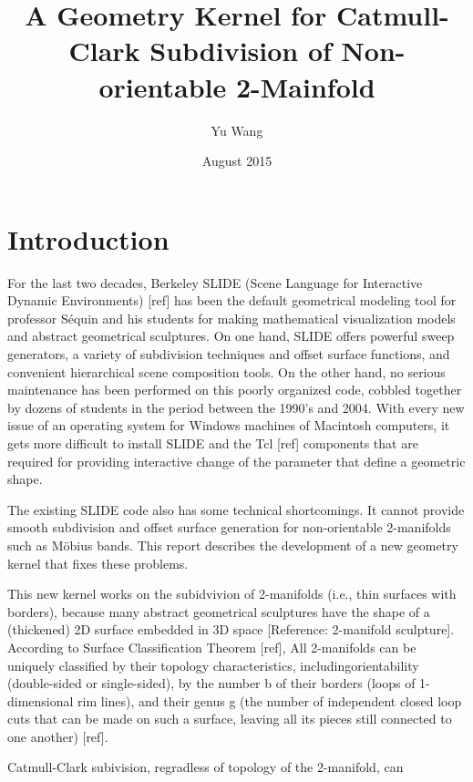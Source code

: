 \documentclass[12pt]{article}
\title{A Geometry Kernel for Catmull-Clark Subdivision of Non-orientable 2-Mainfold}
\author{Yu Wang}
\date{August 2015}
\begin{document}
\maketitle
\newpage

\tableofcontents
\newpage
\section{Introduction}
For the last two decades, Berkeley SLIDE (Scene Language for Interactive Dynamic Environments) [ref] has been the default geometrical modeling tool for professor Séquin and his students for making mathematical visualization models and abstract geometrical sculptures.  On one hand, SLIDE offers powerful sweep generators, a variety of subdivision techniques and offset surface functions, and convenient hierarchical scene composition tools.  On the other hand, no serious maintenance has been performed on this poorly organized code, cobbled together by dozens of students in the period between the 1990’s and 2004.  With every new issue of an operating system for Windows machines of Macintosh computers, it gets more difficult to install SLIDE and the Tcl [ref] components that are required for providing interactive change of the parameter that define a geometric shape.

The existing SLIDE code also has some technical shortcomings.  It cannot provide smooth subdivision and offset surface generation for non-orientable 2-manifolds such as Möbius bands.  This report describes the development of a new geometry kernel that fixes these problems.

This new kernel works on the subidvivion of 2-manifolds (i.e., thin surfaces with borders), because many abstract geometrical sculptures have the shape of a (thickened) 2D surface embedded in 3D space [Reference: 2-manifold sculpture]. According to Surface Classification Theorem [ref], All 2-manifolds can be uniquely classified by their topology characteristics, includingorientability (double-sided or single-sided), by the number b of their borders (loops of 1-dimensional rim lines), and their genus g (the number of independent closed loop cuts that can be made on such a surface, leaving all its pieces still connected to one another) [ref]. 

Catmull-Clark subivision, regradless of topology of the 2-manifold, can 
\end{document}
